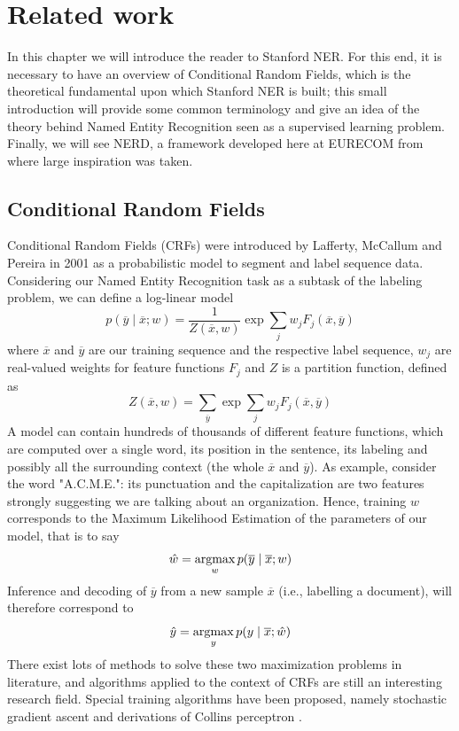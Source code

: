 \documentclass[a4paper,11pt]{report}
\newcommand{\argmax}{\operatornamewithlimits{argmax}}
\begin{document}
\chapter{Related work}
In this chapter we will introduce the reader to Stanford NER. For this end, it is necessary to have an overview of Conditional Random Fields, which is the theoretical fundamental upon which Stanford NER is built; this small introduction will provide some common terminology and give an idea of the theory behind Named Entity Recognition seen as a supervised learning problem. Finally, we will see NERD, a framework developed here at EURECOM from where large inspiration was taken.
\section{Conditional Random Fields}
\label{sec:crfs}
Conditional Random Fields (CRFs) were introduced by Lafferty, McCallum and Pereira in 2001\cite{lafferty2001conditional} as a probabilistic model to segment and label sequence data. Considering our Named Entity Recognition task as a subtask of the labeling problem, we can define a log-linear model
$$
p(\overline{y} \mid \overline{x}; w) = \frac{1}{Z(\overline{x}, w)}\exp\sum\limits_j w_jF_j(\overline{x}, \overline{y})
$$
where $\overline{x}$ and $\overline{y}$ are our training sequence and the respective label sequence, $w_j$ are real-valued weights for feature functions $F_j$ and $Z$ is a partition function, defined as
$$
Z(\overline{x}, w) = \sum\limits_{\overline{y}}\exp\sum\limits_j w_jF_j(\overline{x}, \overline{y})
$$
A model can contain hundreds of thousands of different feature functions, which are computed over a single word, its position in the sentence, its labeling and possibly all the surrounding context (the whole $\overline{x}$ and $\overline{y}$). As example, consider the word "A.C.M.E.": its punctuation and the capitalization are two features strongly suggesting we are talking about an organization.
Hence, training $w$ corresponds to the Maximum Likelihood Estimation of the parameters of our model, that is to say
$$
\hat{w} = \argmax_w p(\overline{y} \mid \overline{x}; w)
$$
Inference and decoding of $\overline{y}$ from a new sample $\overline{x}$ (i.e., labelling a document), will therefore correspond to
$$
\hat{y} = \argmax_y p(y \mid \overline{x}; \hat{w})
$$
There exist lots of methods to solve these two maximization problems in literature, and algorithms applied to the context of CRFs are still an interesting research field. Special training algorithms have been proposed, namely stochastic gradient ascent and derivations of Collins perceptron \cite{elkan2008log}.
\end{document}
